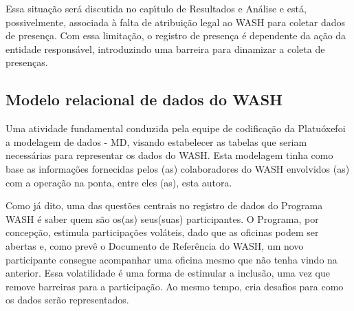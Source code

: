 \documentclass[
12pt,		%
openright,	%
twoside,  %
a4paper,			%
chapter=TITLE,		%
english,			%
french,				%
spanish,			%
brazil				%
]{USPSC-classe/USPSC}
\begin{document}
\noindent\begin{center}\mbox{\centering{}}\end{center}


Essa situa\c{c}\~ao ser\'a discutida no cap\'{\i}tulo de Resultados e An\'alise e est\'a, possivelmente, associada \`a falta de atribui\c{c}\~ao legal ao WASH para coletar dados de presen\c{c}a. Com essa limita\c{c}\~ao, o registro de presen\c{c}a \'e dependente da a\c{c}\~ao da entidade respons\'avel, introduzindo uma barreira para dinamizar a coleta de presen\c{c}as.









\subsection[Modelo relacional de dados do WASH]{Modelo relacional de dados do WASH}\label{Modelo relacional de dados do WASH}
Uma atividade fundamental conduzida pela equipe de codifica\c{c}\~ao da \textquotedbl Platu\'oxe\textquotedbl  foi a modelagem de dados - MD, visando estabelecer as tabelas que seriam necess\'arias para representar os dados do WASH. Esta modelagem tinha como base as informa\c{c}\~oes fornecidas pelos (as) colaboradores do WASH envolvidos (as) com a opera\c{c}\~ao na ponta, entre eles (as), esta autora.









Como j\'a dito, uma das quest\~oes centrais no registro de dados do Programa WASH \'e saber quem s\~ao os(as) seus(suas) participantes. O Programa, por concep\c{c}\~ao, estimula participa\c{c}\~oes vol\'ateis, dado que as oficinas podem ser abertas e, como prev\^e o Documento de Refer\^encia do WASH, um novo participante consegue acompanhar uma oficina mesmo que n\~ao tenha vindo na anterior. Essa volatilidade \'e uma forma de estimular a inclus\~ao, uma vez que remove barreiras para a participa\c{c}\~ao. Ao mesmo tempo, cria desafios para como os dados ser\~ao representados.
\end{document}

